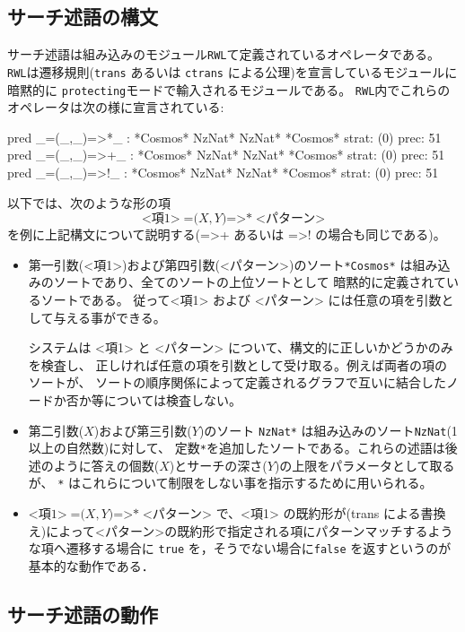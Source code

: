 \documentclass{article}
\begin{document}
\subsection{サーチ述語の構文}
\label{sec:search-peed-syntax}
サーチ述語は組み込みのモジュール\texttt{RWL}て定義されているオペレータである。
\texttt{RWL}は遷移規則(\texttt{trans} あるいは \texttt{ctrans} による公理)を宣言しているモジュールに暗黙的に \texttt{protecting}モードで輸入されるモジュールである。
\texttt{RWL}内でこれらのオペレータは次の様に宣言されている:
\begin{simplev}
    pred _=(_,_)=>*_ : *Cosmos* NzNat* NzNat* *Cosmos* { strat: (0) prec: 51 }
    pred _=(_,_)=>+_ : *Cosmos* NzNat* NzNat* *Cosmos* { strat: (0) prec: 51 }
    pred _=(_,_)=>!_ : *Cosmos* NzNat* NzNat* *Cosmos* { strat: (0) prec: 51 }
\end{simplev}
以下では、次のような形の項
\[ \mbox{<項1>}\; \mbox{=(} X, Y \mbox{)=>*}\; \mbox{<パターン>} \]
を例に上記構文について説明する(=>+ あるいは =>! の場合も同じである)。
\begin{itemize}
\item 第一引数(<項1>)および第四引数(<パターン>)のソート\texttt{*Cosmos*} は組み込みのソートであり、全てのソートの上位ソートとして
  暗黙的に定義されているソートである。
  従って<項1> および <パターン> には任意の項を引数として与える事ができる。

  システムは <項1> と <パターン> について、構文的に正しいかどうかのみを検査し、
  正しければ任意の項を引数として受け取る。例えば両者の項のソートが、
  ソートの順序関係によって定義されるグラフで互いに結合したノードか否か等については検査しない。

\item 第二引数($X$)および第三引数($Y$)のソート \texttt{NzNat*} は組み込みのソート\texttt{NzNat}(1以上の自然数)に対して、
定数\texttt{*}を追加したソートである。これらの述語は後述のように答えの個数($X$)とサーチの深さ($Y$)の上限をパラメータとして取るが、
\texttt{*} はこれらについて制限をしない事を指示するために用いられる。
\item $\mbox{<項1>}\; \mbox{=(}X,Y\mbox{)=>*}\; \mbox{<パターン>}$ で、<項1> の既約形が(trans  による書換え)によって<パターン>の既約形で指定される項にパターンマッチするような項へ遷移する場合に \texttt{true} を，そうでない場合に\texttt{false}
を返すというのが基本的な動作である．
\end{itemize}

\subsection{サーチ述語の動作}
\end{document}
